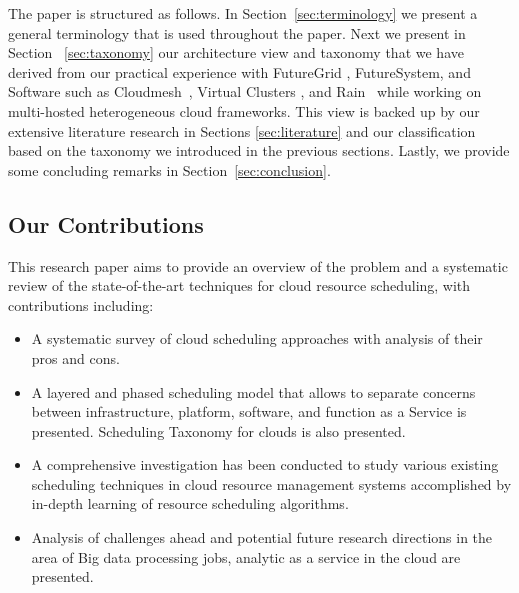 \documentclass[final,5p,times,twocolumn]{elsarticle}
\begin{document}
The paper is structured as follows.  In Section~\ref{sec:terminology} we present
a general terminology that is used throughout the paper. Next we present in
Section ~\ref{sec:taxonomy} our architecture view and taxonomy that we have
derived from our practical experience with FutureGrid
\cite{las12fg-bookchapter,fox2013futuregrid}, FutureSystem, and Software such as
Cloudmesh~\cite{von2014accessing}, Virtual Clusters \cite{las-comet}, and
Rain~\cite{las-fg-1295,las10dynamic,las-rain} while working on multi-hosted
heterogeneous cloud frameworks. This view is backed up by our extensive
literature research in Sections \ref{sec:literature} and our classification
based on the taxonomy we introduced in the previous sections. Lastly, we provide
some concluding remarks in Section~\ref{sec:conclusion}.


\subsection{Our Contributions}

\color{red}
This research paper aims to provide an overview of the problem and a systematic review of the state-of-the-art techniques for cloud resource scheduling, with contributions including: 

\begin{itemize}

\item A systematic survey of cloud scheduling approaches with analysis
  of their pros and cons.

\item A layered and phased scheduling model that allows to separate
  concerns between infrastructure, platform, software, and function as
  a Service is presented. Scheduling Taxonomy for clouds is also
  presented.

\item A comprehensive investigation has been conducted to study
  various existing scheduling techniques in cloud resource management
  systems accomplished by in-depth learning of resource scheduling
  algorithms.

\item Analysis of challenges ahead and potential future research
  directions in the area of Big data processing jobs, analytic as a
  service in the cloud are presented.

\end{itemize}

\color{black}
\end{document}
